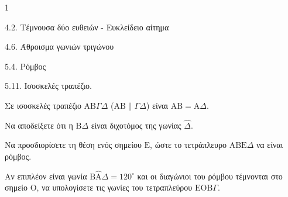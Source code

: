 \begin{ylh}{1}
    \item 4.2. Τέμνουσα δύο ευθειών - Ευκλείδειο αίτημα
    \item 4.6. Άθροισμα γωνιών τριγώνου
    \item 5.4. Ρόμβος
    \item 5.11. Ισοσκελές τραπέζιο.
\end{ylh}
Σε ισοσκελές τραπέζιο $\mathrm{A}\mathrm{B}\Gamma\Delta$ ($\mathrm{A}\mathrm{B} \parallel \Gamma\Delta$) είναι $\mathrm{A}\mathrm{B} = \mathrm{A}\Delta$.
\begin{alist}
    \item Να αποδείξετε ότι η $\mathrm{B}\Delta$ είναι διχοτόμος της γωνίας $\hat{\Delta}$. 
    \item Να προσδιορίσετε τη θέση ενός σημείου $\mathrm{E}$, ώστε το τετράπλευρο $\mathrm{A}\mathrm{B}\mathrm{E}\Delta$ να είναι ρόμβος. 
    \item Αν επιπλέον είναι γωνία $\mathrm{B}\hat{\mathrm{A}}\Delta = 120^\circ$ και οι διαγώνιοι του ρόμβου τέμνονται στο σημείο $\mathrm{O}$, να υπολογίσετε τις γωνίες του τετραπλεύρου $\mathrm{E}\mathrm{O}\mathrm{B}\Gamma$. 
\end{alist}
